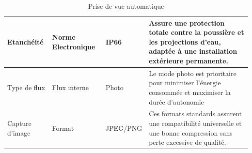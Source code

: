 \begin{table}[ht]
\begin{tabularx}{\textwidth}{|p{3cm}|p{2.5cm}|p{2.5cm}|X|}
      \hline
      Etanchéité                & Norme Electronique                   & IP66                     & Assure une protection totale contre la poussière et les projections d'eau, adaptée à une installation extérieure permanente.                                      \\
      \hline
      Type de flux              & Flux interne                         & Photo                    & Le mode photo est prioritaire pour minimiser l'énergie consommée et maximiser la durée d'autonomie                                                                \\
      \hline
      Capture d'image           & Format                               & JPEG/PNG                 & Ces formats standards assurent une compatibilité universelle et une bonne compression sans perte excessive de qualité.                                            \\
      \hline
   \end{tabularx}
   \caption{Prise de vue automatique}
\end{table}


